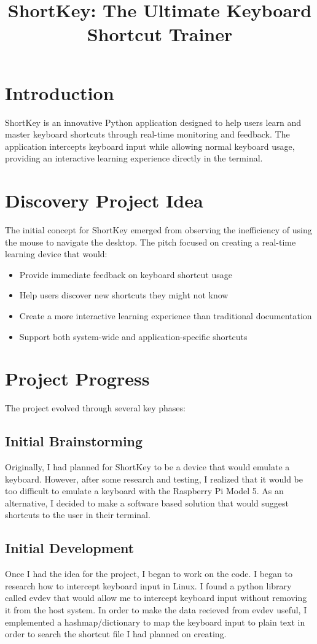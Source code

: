 \documentclass{article}
\title{ShortKey: The Ultimate Keyboard Shortcut Trainer}
\author{}
\date{}
\begin{document}
\maketitle

\section{Introduction}
ShortKey is an innovative Python application designed to help users learn and master keyboard shortcuts through real-time monitoring and feedback. The application intercepts keyboard input while allowing normal keyboard usage, providing an interactive learning experience directly in the terminal.

\section{Discovery Project Idea}
The initial concept for ShortKey emerged from observing the inefficiency of using the mouse to navigate the desktop. The pitch focused on creating a real-time learning device that would:
\begin{itemize}
    \item Provide immediate feedback on keyboard shortcut usage
    \item Help users discover new shortcuts they might not know
    \item Create a more interactive learning experience than traditional documentation
    \item Support both system-wide and application-specific shortcuts
\end{itemize}

\section{Project Progress}
The project evolved through several key phases:
\subsection{Initial Brainstorming}
Originally, I had planned for ShortKey to be a device that would emulate a keyboard. However, after some research and testing, I realized that it would be too difficult to emulate a keyboard with the Raspberry Pi Model 5. As an alternative, I decided to make a software based solution that would suggest shortcuts to the user in their terminal.
\subsection{Initial Development}
Once I had the idea for the project, I began to work on the code. I began to research how to intercept keyboard input in Linux. I found a python library called evdev that would allow me to intercept keyboard input without removing it from the host system. In order to make the data recieved from evdev useful, I emplemented a hashmap/dictionary to map the keyboard input to plain text in order to search the shortcut file I had planned on creating.
\end{document}
